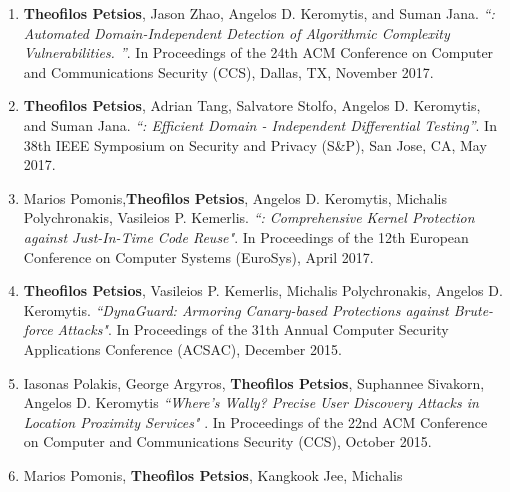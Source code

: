 


\begin{cvparagraph}
\begin{enumerate}[label=C\arabic*]
    \item \textbf{Theofilos Petsios}, Jason Zhao,  Angelos D. Keromytis, and Suman Jana.
        \textit{``\slowfuzz: Automated Domain-Independent Detection of
        Algorithmic Complexity Vulnerabilities. ''}. In
        Proceedings of the 24th ACM Conference on Computer and Communications
        Security (CCS), Dallas, TX, November 2017.\label{itm:slowfuzz}
    \item \textbf{Theofilos Petsios}, Adrian Tang, Salvatore Stolfo, Angelos D.
        Keromytis, and Suman Jana.
        \textit{``\nezha: Efficient Domain - Independent
        Differential Testing''}. In 38th IEEE Symposium on Security and Privacy
        (S\&P), San Jose, CA, May 2017.\label{itm:nezha}
    \item Marios Pomonis,\textbf{Theofilos Petsios}, Angelos D. Keromytis,
        Michalis Polychronakis, Vasileios P. Kemerlis.
        \textit{``\krx: Comprehensive
        Kernel Protection against Just-In-Time Code Reuse"}. In Proceedings
        of the 12th European Conference on Computer Systems (EuroSys),
        April 2017.\label{itm:krx}
    \item \textbf{Theofilos Petsios}, Vasileios P. Kemerlis, Michalis
        Polychronakis, Angelos D. Keromytis. \textit{``DynaGuard: Armoring
        Canary-based Protections against Brute-force Attacks"}. In Proceedings
        of the 31th Annual Computer Security Applications Conference (ACSAC),
        December 2015.\label{itm:dynaguard}
    \item Iasonas Polakis, George Argyros, \textbf{Theofilos Petsios},
        Suphannee Sivakorn, Angelos D. Keromytis \textit{``Where’s Wally?
        Precise User Discovery Attacks in Location Proximity Services"} . In
        Proceedings of the 22nd ACM Conference on Computer and Communications
        Security (CCS), October 2015.\label{itm:istalker}
    \item Marios Pomonis, \textbf{Theofilos Petsios}, Kangkook Jee, Michalis

\end{enumerate}
\end{cvparagraph}
